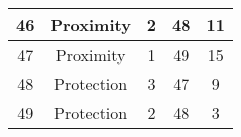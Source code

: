 \documentclass[results.tex]{subfiles}
\begin{document}
\begin{center}
\begin{tabular}{| c || c | c | c | c |}
            \hline
            46                      & Proximity                    & 2                      & 48                      & 11                   \\
            \hline
            47                      & Proximity                    & 1                      & 49                      & 15                   \\
            \hline
            48                      & Protection                   & 3                      & 47                      & 9                    \\
            \hline
            49                      & Protection                   & 2                      & 48                      & 3                    \\
            \hline
        \end{tabular}
    \end{center}
\end{document}
